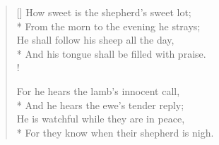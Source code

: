 \documentclass[MAIN]{subfiles}
\begin{document}
\settowidth{\versewidth}{\vin And his tongue shall be filled with praise.}
\begin{verse}[\versewidth]
How sweet is the shepherd's sweet lot;\\*
\vin From the morn to the evening he strays;\\
He shall follow his sheep all the day,\\*
\vin And his tongue shall be filled with praise.\\!

For he hears the lamb's innocent call,\\*
\vin And he hears the ewe's tender reply;\\
He is watchful while they are in peace,\\*
\vin For they know when their shepherd is nigh.
\end{verse}
\end{document}
